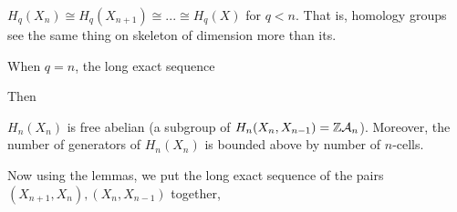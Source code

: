 \documentclass{report}
\begin{document}
\begin{corollary}
    $H_q(X_n) \cong H_q(X_{n+1}) \cong ... \cong H_q(X)$ for $q < n$. That is, homology groups see the same thing on skeleton of dimension more than its.
\end{corollary}


When $q = n$, the long exact sequence
\begin{center}
\end{center}

Then

\begin{corollary}
    $H_n(X_n)$ is free abelian (a subgroup of $H_n(X_n, X_{n-1}) = \mathbb{Z} \mathcal{A}_n$). Moreover, the number of generators of $H_n(X_n)$ is bounded above by number of $n$-cells.
\end{corollary}

Now using the lemmas, we put the long exact sequence of the pairs $(X_{n+1}, X_n), (X_n, X_{n-1})$ together,

\begin{center}
\end{center}
\end{document}

